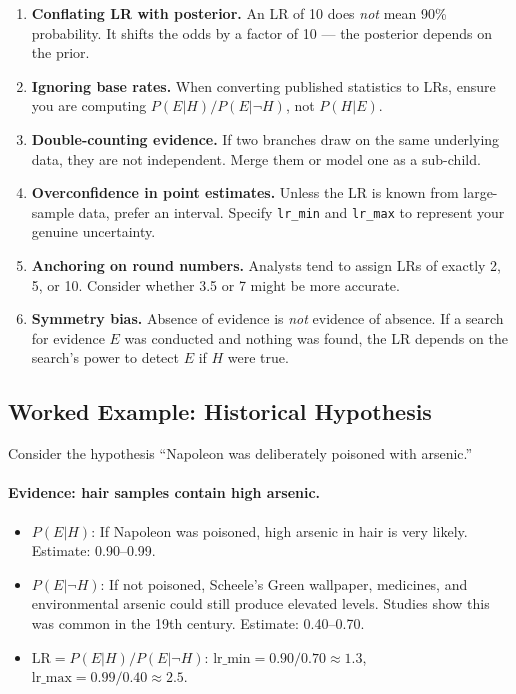\documentclass[11pt,a4paper]{article}
\begin{document}
\begin{enumerate}
\item \textbf{Conflating LR with posterior.} An LR of 10 does \emph{not}
  mean 90\% probability. It shifts the odds by a factor of 10 --- the
  posterior depends on the prior.

\item \textbf{Ignoring base rates.} When converting published statistics to
  LRs, ensure you are computing $P(E|H)/P(E|\neg H)$, not $P(H|E)$.

\item \textbf{Double-counting evidence.} If two branches draw on the same
  underlying data, they are not independent. Merge them or model one as a
  sub-child.

\item \textbf{Overconfidence in point estimates.} Unless the LR is known from
  large-sample data, prefer an interval. Specify \texttt{lr\_min} and
  \texttt{lr\_max} to represent your genuine uncertainty.

\item \textbf{Anchoring on round numbers.} Analysts tend to assign LRs of
  exactly 2, 5, or 10. Consider whether 3.5 or 7 might be more accurate.

\item \textbf{Symmetry bias.} Absence of evidence is \emph{not} evidence of
  absence. If a search for evidence $E$ was conducted and nothing was found,
  the LR depends on the search's power to detect $E$ if $H$ were true.
\end{enumerate}

\subsection{Worked Example: Historical Hypothesis}

Consider the hypothesis ``Napoleon was deliberately poisoned with arsenic.''

\paragraph{Evidence: hair samples contain high arsenic.}
\begin{itemize}
\item $P(E|H)$: If Napoleon was poisoned, high arsenic in hair is very likely.
  Estimate: 0.90--0.99.
\item $P(E|\neg H)$: If not poisoned, Scheele's Green wallpaper, medicines,
  and environmental arsenic could still produce elevated levels. Studies show
  this was common in the 19th century. Estimate: 0.40--0.70.
\item $\text{LR} = P(E|H)/P(E|\neg H)$:
  $\text{lr\_min} = 0.90/0.70 \approx 1.3$,
  $\text{lr\_max} = 0.99/0.40 \approx 2.5$.
\end{itemize}
\end{document}
